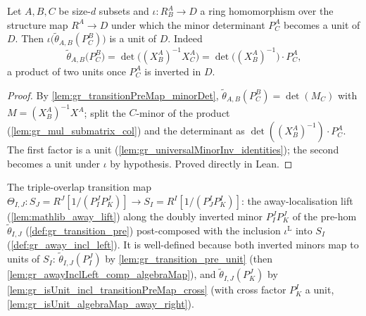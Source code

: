 \begin{lemma}

  \label{lem:gr_isUnit_incl_transitionPreMap_cross}
  Let \(A, B, C\) be size-\(d\) subsets and \(\iota : R^A_B \to D\) a ring
  homomorphism over the structure map \(R^A \to D\) under which the minor
  determinant \(P^A_C\) becomes a unit of \(D\). Then
  \(\iota\bigl(\tilde\theta_{A,B}(P^B_C)\bigr)\) is a unit of \(D\). Indeed
  \[
    \tilde\theta_{A,B}\bigl(P^B_C\bigr)
      = \det\bigl((X^A_B)^{-1} X^A_C\bigr)
      = \det\bigl((X^A_B)^{-1}\bigr)\cdot P^A_C ,
  \]
  a product of two units once \(P^A_C\) is inverted in \(D\).
\end{lemma}
\begin{proof}

\leanok
  By \cref{lem:gr_transitionPreMap_minorDet},
  \(\tilde\theta_{A,B}(P^B_C) = \det(M_C)\) with \(M = (X^A_B)^{-1} X^A\); split
  the \(C\)-minor of the product (\cref{lem:gr_mul_submatrix_col}) and the
  determinant as \(\det((X^A_B)^{-1}) \cdot P^A_C\). The first factor is a unit
  (\cref{lem:gr_universalMinorInv_identities}); the second becomes a unit under
  \(\iota\) by hypothesis. Proved directly in Lean.
\end{proof}

\begin{definition}

  \label{def:gr_cocycle_theta_ij}
  The triple-overlap transition map
  \(\Theta_{I,J} : S_J = R^J[1/(P^J_I P^J_K)] \to S_I = R^I[1/(P^I_J P^I_K)]\):
  the away-localisation lift (\cref{lem:mathlib_away_lift}) along the doubly
  inverted minor \(P^J_I P^J_K\) of the pre-hom \(\tilde\theta_{I,J}\)
  (\cref{def:gr_transition_pre}) post-composed with the inclusion
  \(\iota^{\mathrm{L}}\) into \(S_I\) (\cref{def:gr_away_incl_left}). It is
  well-defined because both inverted minors map to units of \(S_I\):
  \(\tilde\theta_{I,J}(P^J_I)\) by \cref{lem:gr_transition_pre_unit} (then
  \cref{lem:gr_awayInclLeft_comp_algebraMap}), and \(\tilde\theta_{I,J}(P^J_K)\)
  by \cref{lem:gr_isUnit_incl_transitionPreMap_cross} (with cross factor
  \(P^I_K\) a unit, \cref{lem:gr_isUnit_algebraMap_away_right}).
\end{definition}

